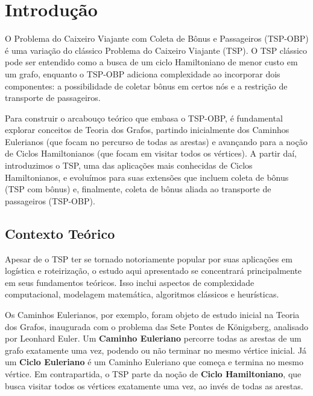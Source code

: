 \documentclass[12pt, a4paper]{report}
\begin{document}

\newpage
\tableofcontents
\thispagestyle{empty}

\newpage
\setcounter{page}{1}
\pagestyle{plain}

\section*{Introdução}
O Problema do Caixeiro Viajante com Coleta de Bônus e Passageiros (TSP-OBP) é uma variação do clássico Problema do Caixeiro Viajante (TSP). O TSP clássico pode ser entendido como a busca de um ciclo Hamiltoniano de menor custo em um grafo, enquanto o TSP-OBP adiciona complexidade ao incorporar dois componentes: a possibilidade de coletar bônus em certos nós e a restrição de transporte de passageiros. 

Para construir o arcabouço teórico que embasa o TSP-OBP, é fundamental explorar conceitos de Teoria dos Grafos, partindo inicialmente dos Caminhos Eulerianos (que focam no percurso de todas as arestas) e avançando para a noção de Ciclos Hamiltonianos (que focam em visitar todos os vértices). A partir daí, introduzimos o TSP, uma das aplicações mais conhecidas de Ciclos Hamiltonianos, e evoluímos para suas extensões que incluem coleta de bônus (TSP com bônus) e, finalmente, coleta de bônus aliada ao transporte de passageiros (TSP-OBP).

\subsection*{Contexto Teórico}
Apesar de o TSP ter se tornado notoriamente popular por suas aplicações em logística e roteirização, o estudo aqui apresentado se concentrará principalmente em seus fundamentos teóricos. Isso inclui aspectos de complexidade computacional, modelagem matemática, algoritmos clássicos e heurísticas. 

Os Caminhos Eulerianos, por exemplo, foram objeto de estudo inicial na Teoria dos Grafos, inaugurada com o problema das Sete Pontes de Königsberg, analisado por Leonhard Euler. Um \textbf{Caminho Euleriano} percorre todas as arestas de um grafo exatamente uma vez, podendo ou não terminar no mesmo vértice inicial. Já um \textbf{Ciclo Euleriano} é um Caminho Euleriano que começa e termina no mesmo vértice. Em contrapartida, o TSP parte da noção de \textbf{Ciclo Hamiltoniano}, que busca visitar todos os vértices exatamente uma vez, ao invés de todas as arestas.
\end{document}
